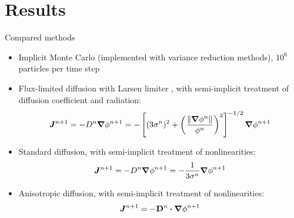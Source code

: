 \documentclass{beamer}
\begin{document}
\section{Results}
\begin{frame}{Compared methods}
\begin{itemize}
  \item Implicit Monte Carlo \cite{Fle1971} (implemented with variance
    reduction methods), $10^6$ particles per time step
  \item Flux-limited diffusion with Larsen limiter \cite{Ols2000}, with
    semi-implicit treatment of diffusion coefficient and radiation:
    \begin{equation*}
      \bm{J}^{n+1} = - D^{n} \bm{\nabla} \phi^{n+1}  = -\left[ (3\sigma^{n})^2
      + \left( \frac{\left\| \bm{\nabla} \phi^{n} \right\|}{\phi^{n}}  \right)^2 \right]^{-1/2}
      \bm{\nabla} \phi^{n+1}
    \end{equation*}
  \item Standard diffusion, with semi-implicit treatment of nonlinearities:
    \begin{equation*}
      \bm{J}^{n+1} = - D^{n} \bm{\nabla} \phi^{n+1} 
      = -\frac{1}{3\sigma^{n}} \bm{\nabla} \phi^{n+1}
    \end{equation*}
  \item Anisotropic diffusion, with semi-implicit treatment of nonlinearities:
    \begin{equation*}
      \bm{J}^{n+1} = -\mathbf{D}^{n}\bm{\cdot} \bm{\nabla} \phi^{n+1} 
    \end{equation*}
\end{itemize}
\end{frame}
\end{document}
